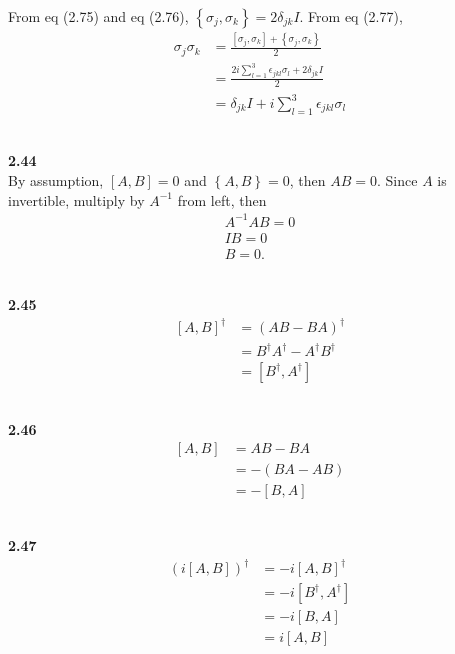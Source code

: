 \documentclass[10pt]{book}
\newcommand{\Textbf}[1]{\hspace{3mm}\\ \textbf{#1}\\}
\begin{document}
	From eq (2.75) and eq (2.76), $\left\{\sigma_j,  \sigma_k \right\} = 2 \delta_{jk} I$.
	From eq (2.77),
	\begin{equation}
\begin{aligned}
		\sigma_j \sigma_k &= \frac{\left[\sigma_j, \sigma_k  \right] + \left\{\sigma_j, \sigma_k \right\}}{2}\\
		&= \frac{2i \sum_{l=1}^{3} \epsilon_{jkl}\sigma_l +  2 \delta_{jk} I}{2}\\
		&= \delta_{jk} I + i \sum_{l=1}^{3} \epsilon_{jkl}\sigma_l
	\end{aligned}
\end{equation}
	
	
	\Textbf{2.44}
	
	By assumption, $\left[A, B\right] = 0$ and $\left\{A, B\right\} = 0$, then $AB = 0$.
	Since $A$ is invertible, multiply by $A^{-1}$ from left, then
	\begin{equation}
\begin{aligned}
		A^{-1} AB = 0\\
		IB = 0\\
		B=0.
	\end{aligned}
\end{equation}
	
	
	\Textbf{2.45}
	\begin{equation}
\begin{aligned}
		\left[A, B\right]^\dagger &= (AB -BA)^\dagger\\
		&= B^\dagger A^\dagger - A^\dagger B^\dagger\\
		&= \left[B^\dagger, A^\dagger \right]
	\end{aligned}
\end{equation}
	
	
	
	\Textbf{2.46}
	\begin{equation}
\begin{aligned}
		\left[A, B\right] &= AB - BA\\
		&= - (BA - AB)\\
		&= -\left[B, A\right]
	\end{aligned}
\end{equation}
	
	
	
	\Textbf{2.47}
	\begin{equation}
\begin{aligned}
		\left(i \left[A, B\right] \right)^\dagger &= -i \left[A, B\right]^\dagger\\
		&= -i \left[B^\dagger, A^\dagger \right]\\
		&= -i \left[B, A \right]\\
		&= i \left[A, B\right]
	\end{aligned}
\end{equation}
	
\end{document}
